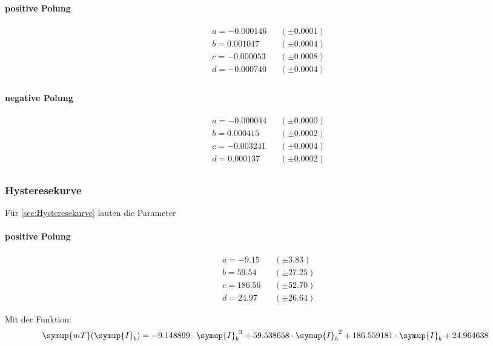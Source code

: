 \begin{minipage}{0.49\textwidth}
\centering
\paragraph{positive Polung}
\begin{align*}
&a = -0.000146 &&(\pm  0.0001) \\
&b = 0.001047 &&(\pm  0.0004 ) \\
&c = -0.000053 &&(\pm  0.0008) \\
&d = -0.000740 &&(\pm  0.0004) \\
\end{align*}
\end{minipage}
\hfill
\begin{minipage}{0.49\textwidth}
\centering
\paragraph{negative Polung}
\begin{align*}
&a = -0.000044 &&(\pm 0.0000) \\
&b = 0.000415 &&(\pm 0.0002) \\
&c = -0.003241 &&(\pm 0.0004) \\
&d = 0.000137 &&(\pm 0.0002) \\
\end{align*}
\end{minipage}




\subsubsection{Hysteresekurve}
Für \ref{sec:Hysteresekurve} lauten die Parameter
\vspace{1cm}

\begin{minipage}{0.3\textwidth}
\centering
\paragraph{positive Polung}
\begin{align*}
&a = -9.15 &&(\pm 3.83) \\
&b = 59.54 &&(\pm 27.25) \\
&c = 186.56 &&(\pm 52.70) \\
&d = 24.97 &&(\pm 26.64)
\end{align*}
\end{minipage}
\hfill
\begin{minipage}{0.69\textwidth}
Mit der Funktion:
{\footnotesize
\begin{equation*}
 \symup{mT}(\symup{I}_b)=-9.148899 \cdot {\symup{I}_b}^3 + 59.538658 \cdot {\symup{I}_b}^2 + 186.559181 \cdot {\symup{I}_b} + 24.964638
\end{equation*}
}
\end{minipage}



